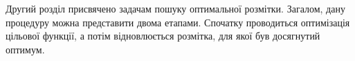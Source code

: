 Другий розділ присвячено задачам пошуку оптимальної розмітки. Загалом, 
дану процедуру можна представити двома етапами. Спочатку проводиться оптимізація
цільової функції, а потім відновлюється розмітка, для якої був досягнутий оптимум.